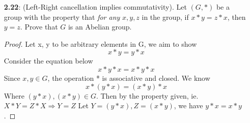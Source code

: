 \documentclass[11pt, oneside]{article}
\begin{document}
\begin{enumerate}
\begin{proof}
 Now we aim to prove $\hat{G}\supseteq G$. For arbitrary element in G, call it g, it is an symmetry of the original shape A. Thus we can find its numbering on each vertex. If the numbering is in clock-wise, then it is one of the rotation symmetry without performing reflection. If it is counter clockwise, then it is one of the rotation symmetry after performing one reflection. Thus $g\in \hat{G}$, $\hat{G}= G$, G has 2n elements.
  
\end{proof}

\item[{\bf 2.22}:] (Left-Right cancellation implies commutativity). Let $(G,*)$ be a group with the property that {\it for any} $x,y,z$ in the group, if $x*y=z*x$, then $y=z$. Prove that $G$ is an Abelian group. 
\begin{proof}
Let x, y to be arbitrary elements in G, we aim to show
\[ x * y = y*x \]
Consider the equation below
\[x*y*x=x*y*x\]
Since $x,y\in G$, the operation * is associative and closed. We know
\[x*(y*x)=(x*y)*x\] 
Where $(y*x),(x*y)\in G$. Then by the property given, ie. $X*Y=Z*X \Rightarrow{}Y=Z$ 
\newline Let $Y=(y*x), Z=(x*y)$, we have $y*x=x*y$.


\end{proof}


\end{enumerate}
\end{document}
